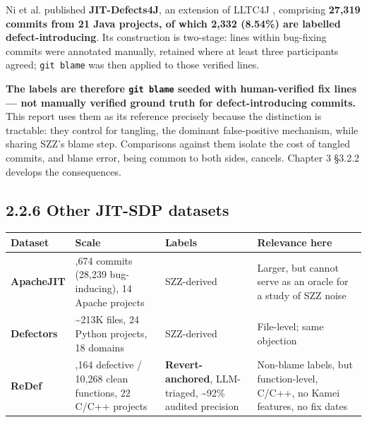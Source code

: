 Ni et al. \citep{ni2022jitdefects4j} published \textbf{JIT-Defects4J},
an extension of LLTC4J \citep{herbold2022tangling}, comprising
\textbf{27,319 commits from 21 Java projects, of which 2,332 (8.54\%)
are labelled defect-introducing}. Its construction is two-stage: lines
within bug-fixing commits were annotated manually, retained where at
least three participants agreed; \texttt{git\ blame} was then applied to
those verified lines.

\textbf{The labels are therefore \texttt{git\ blame} seeded with
human-verified fix lines --- not manually verified ground truth for
defect-introducing commits.} This report uses them as its reference
precisely because the distinction is tractable: they control for
tangling, the dominant false-positive mechanism, while sharing SZZ's
blame step. Comparisons against them isolate the cost of tangled
commits, and blame error, being common to both sides, cancels. Chapter 3
\S{}3.2.2 develops the consequences.

\subsection{2.2.6 Other JIT-SDP datasets}\label{other-jit-sdp-datasets}

\begin{longtable}[]{@{}
  >{\raggedright\arraybackslash}p{}
  >{\raggedright\arraybackslash}p{}
  >{\raggedright\arraybackslash}p{}
  >{\raggedright\arraybackslash}p{}@{}}
\toprule\noalign{}
\begin{minipage}[b]{\linewidth}\raggedright
Dataset
\end{minipage} & \begin{minipage}[b]{\linewidth}\raggedright
Scale
\end{minipage} & \begin{minipage}[b]{\linewidth}\raggedright
Labels
\end{minipage} & \begin{minipage}[b]{\linewidth}\raggedright
Relevance here
\end{minipage} \\
\midrule\noalign{}
\endhead
\bottomrule\noalign{}
\endlastfoot
\textbf{ApacheJIT} \citep{keshavarz2022apachejit} & 106,674 commits
(28,239 bug-inducing), 14 Apache projects & SZZ-derived & Larger, but
cannot serve as an oracle for a study of SZZ noise \\
\textbf{Defectors} \citep{mahbub2023defectors} & \textasciitilde213K
files, 24 Python projects, 18 domains & SZZ-derived & File-level; same
objection \\
\textbf{ReDef} & 3,164 defective / 10,268 clean functions, 22 C/C++
projects & \textbf{Revert-anchored}, LLM-triaged, \textasciitilde92\%
audited precision & Non-blame labels, but function-level, C/C++, no
Kamei features, no fix dates \\
\end{longtable}

